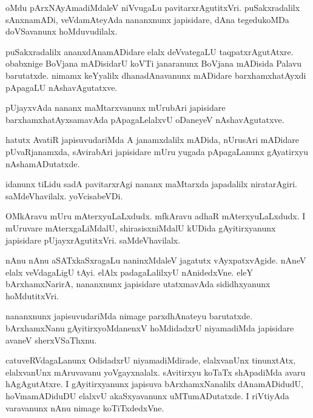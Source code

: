 \documentclass{article}
\begin{document}
\begin{mn}
oMdu  pArxNAyAmadiMdaleV  niVvugaLu  pavitarxrAgutitxVri.  puSakxradalilx  sAnxnamADi,  
veVdamAteyAda  nananxnunx  japisidare,  dAna  tegedukoMDa  doVSavanunx  hoMduvudilalx.
\end{mn}

\begin{mn}
puSakxradalilx  ananxdAnamADidare  elalx  deVvategaLU  taqpatxrAgutAtxre.  obabxnige  
BoVjana mADisidarU  koVTi janaranunx   BoVjana mADisida  Palavu  barutatxde.  nimamx  
keYyalilx  dhanadAnavanunx  mADidare  barxhamxhatAyxdi pApagaLU nAshavAgutatxve.
\end{mn}

\begin{mn}
pUjayxvAda  nananx maMtarxvanunx  mUrubAri  japisidare  barxhamxhatAyxsamavAda  
pApagaLelalxvU  oDaneyeV  nAshavAgutatxve.
\end{mn}

\begin{mn}
hatutx  AvatiR  japisuvudariMda  A  janamxdalilx  mADida,  nUrusAri  mADidare  pUvaRjanamxda,  
sAvirabAri  japisidare  mUru  yugada  pApagaLanunx  gAyatirxyu  nAshamADutatxde.
\end{mn}

\begin{mn}
idanunx  tiLidu  sadA  pavitarxrAgi  nananx  maMtarxda  japadalilx  niratarAgiri.  
saMdeVhavilalx.  yoVcisabeVDi.
\end{mn}

\begin{mn}
OMkAravu  mUru  mAterxyuLaLxdudx.  mfkAravu  adhaR  mAterxyuLaLxdudx.  I mUruvare  mAterxgaLiMdalU,  
shirasisxniMdalU  kUDida  gAyitirxyanunx  japisidare  pUjayxrAgutitxVri.  saMdeVhavilalx.
\end{mn}

\begin{mn}
nAnu nAnu  aSATxkaSxragaLu  naninxMdaleV  jagatutx  vAyxpatxvAgide.  nAneV  elalx  
veVdagaLigU  tAyi.  elAlx  padagaLalilxyU  nAnidedxVne.  eleY  bArxhamxNarirA,  
nananxnunx  japisidare  utatxmavAda  sididhxyanunx  hoMdutitxVri.
\end{mn}

\begin{mn}
nananxnunx  japisuvudariMda  nimage  parxdhAnateyu  barutatxde.  bArxhamxNanu  
gAyitirxyoMdanenxV  hoMdidadxrU niyamadiMda  japisidare  avaneV  sherxVSaThxnu.
\end{mn}

\begin{mn}
catuveRVdagaLanunx  OdidadxrU  niyamadiMdirade,  elalxvanUnx  tinunxtAtx,  elalxvanUnx  
mAruvavanu  yoVgayxnalalx.  sAvitirxyu koTaTx  shApadiMda  avaru  hAgAgutAtxre.   
I gAyitirxyanunx  japisuva  bArxhamxNanalilx  dAnamADidudU,  hoVmamADiduDU  elalxvU  
akaSxyavanunx  uMTumADutatxde.  I riVtiyAda  varavanunx  nAnu  nimage  koTiTxdedxVne.  
\end{mn}
\end{document}
